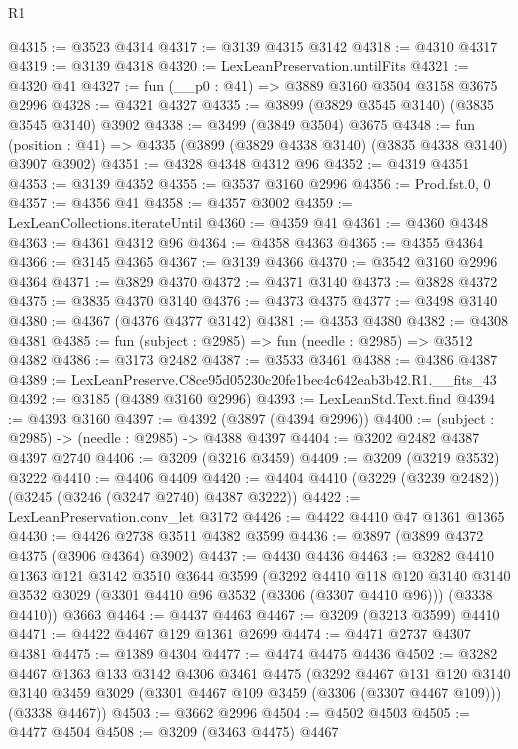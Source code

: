 \begin{lexlean}{R1}
\begin{coremodule}
@4315 := @3523 @4314
@4317 := @3139 @4315 @3142
@4318 := @4310 @4317
@4319 := @3139 @4318
@4320 := LexLeanPreservation.untilFits
@4321 := @4320 @41
@4327 := fun (__p0 : @41) => @3889 @3160 @3504 @3158 @3675 @2996
@4328 := @4321 @4327
@4335 := @3899 (@3829 @3545 @3140) (@3835 @3545 @3140) @3902
@4338 := @3499 (@3849 @3504) @3675
@4348 := fun (position : @41) => @4335 (@3899 (@3829 @4338 @3140) (@3835 @4338 @3140) @3907 @3902)
@4351 := @4328 @4348 @4312 @96
@4352 := @4319 @4351
@4353 := @3139 @4352
@4355 := @3537 @3160 @2996
@4356 := Prod.fst.{0, 0}
@4357 := @4356 @41
@4358 := @4357 @3002
@4359 := LexLeanCollections.iterateUntil
@4360 := @4359 @41
@4361 := @4360 @4348
@4363 := @4361 @4312 @96
@4364 := @4358 @4363
@4365 := @4355 @4364
@4366 := @3145 @4365
@4367 := @3139 @4366
@4370 := @3542 @3160 @2996 @4364
@4371 := @3829 @4370
@4372 := @4371 @3140
@4373 := @3828 @4372
@4375 := @3835 @4370 @3140
@4376 := @4373 @4375
@4377 := @3498 @3140
@4380 := @4367 (@4376 @4377 @3142)
@4381 := @4353 @4380
@4382 := @4308 @4381
@4385 := fun (subject : @2985) => fun (needle : @2985) => @3512 @4382
@4386 := @3173 @2482
@4387 := @3533 @3461
@4388 := @4386 @4387
@4389 := LexLeanPreserve.C8ce95d05230c20fe1bec4c642eab3b42.R1.__fits_43
@4392 := @3185 (@4389 @3160 @2996)
@4393 := LexLeanStd.Text.find
@4394 := @4393 @3160
@4397 := @4392 (@3897 (@4394 @2996))
@4400 := (subject : @2985) -> (needle : @2985) -> @4388 @4397
@4404 := @3202 @2482 @4387 @4397 @2740
@4406 := @3209 (@3216 @3459)
@4409 := @3209 (@3219 @3532) @3222
@4410 := @4406 @4409
@4420 := @4404 @4410 (@3229 (@3239 @2482)) (@3245 (@3246 (@3247 @2740) @4387 @3222))
@4422 := LexLeanPreservation.conv_let @3172
@4426 := @4422 @4410 @47 @1361 @1365
@4430 := @4426 @2738 @3511 @4382 @3599
@4436 := @3897 (@3899 @4372 @4375 (@3906 @4364) @3902)
@4437 := @4430 @4436
@4463 := @3282
    @4410
    @1363
    @121
    @3142
    @3510
    @3644
    @3599
    (@3292
      @4410
      @118
      @120
      @3140
      @3140
      @3532
      @3029
      (@3301 @4410 @96 @3532 (@3306 (@3307 @4410 @96)))
      (@3338 @4410))
    @3663
@4464 := @4437 @4463
@4467 := @3209 (@3213 @3599) @4410
@4471 := @4422 @4467 @129 @1361 @2699
@4474 := @4471 @2737 @4307 @4381
@4475 := @1389 @4304
@4477 := @4474 @4475 @4436
@4502 := @3282
    @4467
    @1363
    @133
    @3142
    @4306
    @3461
    @4475
    (@3292
      @4467
      @131
      @120
      @3140
      @3140
      @3459
      @3029
      (@3301 @4467 @109 @3459 (@3306 (@3307 @4467 @109)))
      (@3338 @4467))
@4503 := @3662 @2996
@4504 := @4502 @4503
@4505 := @4477 @4504
@4508 := @3209 (@3463 @4475) @4467

\end{coremodule}
\end{lexlean}
